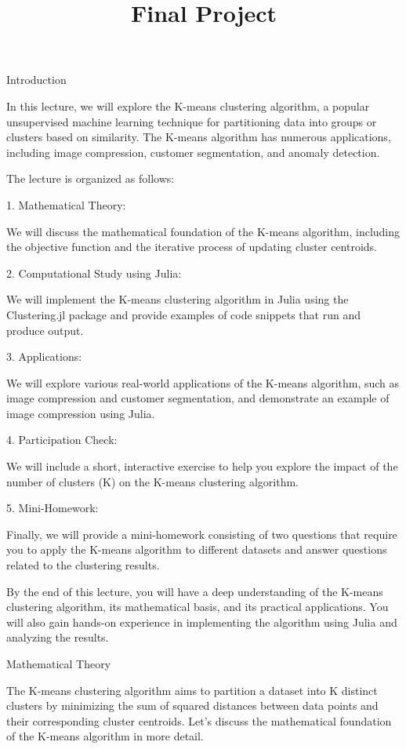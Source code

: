 \documentclass[11pt]{article}
\title{Final Project}
\begin{document}
    
    \maketitle
    
    

    
    {Introduction}

    In this lecture, we will explore the K-means clustering algorithm, a
popular unsupervised machine learning technique for partitioning data
into groups or clusters based on similarity. The K-means algorithm has
numerous applications, including image compression, customer
segmentation, and anomaly detection.

    The lecture is organized as follows:

    {1. Mathematical Theory:}

We will discuss the mathematical foundation of the K-means algorithm,
including the objective function and the iterative process of updating
cluster centroids.

    {2. Computational Study using Julia:}

We will implement the K-means clustering algorithm in Julia using the
Clustering.jl package and provide examples of code snippets that run and
produce output.

    {3. Applications:}

We will explore various real-world applications of the K-means
algorithm, such as image compression and customer segmentation, and
demonstrate an example of image compression using Julia.

    {4. Participation Check:}

We will include a short, interactive exercise to help you explore the
impact of the number of clusters (K) on the K-means clustering
algorithm.

    {5. Mini-Homework:}

Finally, we will provide a mini-homework consisting of two questions
that require you to apply the K-means algorithm to different datasets
and answer questions related to the clustering results.

    By the end of this lecture, you will have a deep understanding of the
K-means clustering algorithm, its mathematical basis, and its practical
applications. You will also gain hands-on experience in implementing the
algorithm using Julia and analyzing the results.

    {Mathematical Theory}

    The K-means clustering algorithm aims to partition a dataset into K
distinct clusters by minimizing the sum of squared distances between
data points and their corresponding cluster centroids. Let's discuss the
mathematical foundation of the K-means algorithm in more detail.
\end{document}
